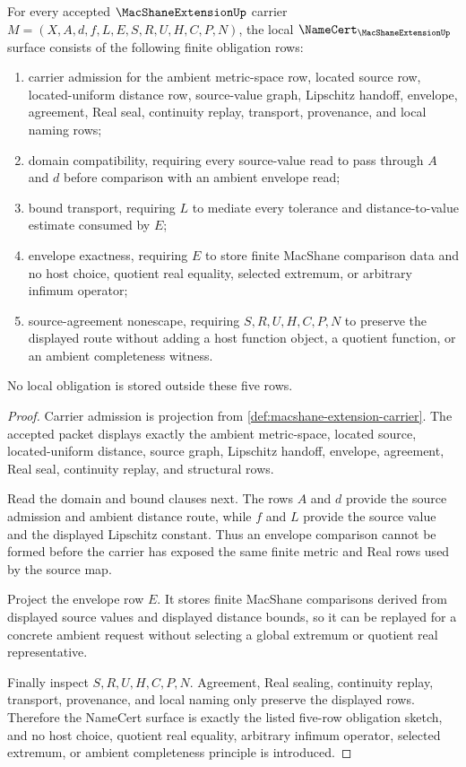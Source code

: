 \begin{theorem}
\label{thm:macshane-extension-namecert-obligations}
For every accepted $\MacShaneExtensionUp$ carrier $M=(X,A,d,f,L,E,S,R,U,H,C,P,N)$, the local $\NameCert_{\MacShaneExtensionUp}$ surface consists of the following finite obligation rows:
\begin{enumerate}
\item carrier admission for the ambient metric-space row, located source row, located-uniform distance row, source-value graph, Lipschitz handoff, envelope, agreement, Real seal, continuity replay, transport, provenance, and local naming rows;
\item domain compatibility, requiring every source-value read to pass through $A$ and $d$ before comparison with an ambient envelope read;
\item bound transport, requiring $L$ to mediate every tolerance and distance-to-value estimate consumed by $E$;
\item envelope exactness, requiring $E$ to store finite MacShane comparison data and no host choice, quotient real equality, selected extremum, or arbitrary infimum operator;
\item source-agreement nonescape, requiring $S,R,U,H,C,P,N$ to preserve the displayed route without adding a host function object, a quotient function, or an ambient completeness witness.
\end{enumerate}
No local obligation is stored outside these five rows.
\end{theorem}
\begin{proof}
Carrier admission is projection from \autoref{def:macshane-extension-carrier}. The accepted packet displays exactly the ambient metric-space, located source, located-uniform distance, source graph, Lipschitz handoff, envelope, agreement, Real seal, continuity replay, and structural rows.

Read the domain and bound clauses next. The rows $A$ and $d$ provide the source admission and ambient distance route, while $f$ and $L$ provide the source value and the displayed Lipschitz constant. Thus an envelope comparison cannot be formed before the carrier has exposed the same finite metric and Real rows used by the source map.

Project the envelope row $E$. It stores finite MacShane comparisons derived from displayed source values and displayed distance bounds, so it can be replayed for a concrete ambient request without selecting a global extremum or quotient real representative.

Finally inspect $S,R,U,H,C,P,N$. Agreement, Real sealing, continuity replay, transport, provenance, and local naming only preserve the displayed rows. Therefore the NameCert surface is exactly the listed five-row obligation sketch, and no host choice, quotient real equality, arbitrary infimum operator, selected extremum, or ambient completeness principle is introduced.
\end{proof}

